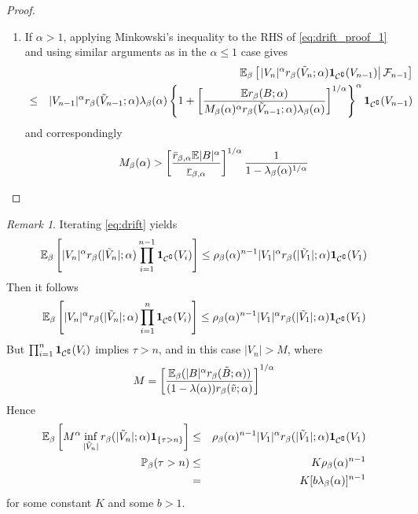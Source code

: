 \documentclass{article}
\theoremstyle{remark}
\newtheorem{remark}{Remark}
\begin{document}
\begin{proof}
\begin{enumerate}
    \item If $\alpha > 1$, applying Minkowski's inequality to the RHS
      of \eqref{eq:drift_proof_1} and using similar arguments as in
      the $\alpha \leq 1$ case gives
      \begin{eqnarray*}
        && \mathbb{E}_\beta \left[ \left.
          |V_n|^\alpha r_\beta(\tilde V_{n}; \alpha)
          \mathbf{1}_{\mathcal C^\complement}(V_{n-1})
          \right| \mathcal F_{n-1}
        \right] \\
        &\leq&
        |V_{n-1}|^\alpha r_\beta(\tilde V_{n-1}; \alpha)
        \lambda_\beta(\alpha) \left\{
          1 + \left[
            {
              \mathbb{E} r_\beta(B; \alpha)
              \over
              M_\beta(\alpha)^\alpha
              r_\beta(\tilde V_{n-1}; \alpha)
              \lambda_\beta(\alpha)
            }
          \right]^{1/\alpha}
          \right\}^\alpha
          \mathbf{1}_{\mathcal C^\complement}(V_{n-1})
      \end{eqnarray*}
      and correspondingly
      \begin{equation*}
        M_\beta(\alpha) > \left[
          {
            \bar r_{\beta,\alpha} \mathbb{E} |B|^\alpha
            \over
            \underline r_{\beta, \alpha}
          }
        \right]^{1/\alpha} {
          1 \over
          1 - \lambda_\beta(\alpha)^{1/\alpha}
        }
      \end{equation*}
  \end{enumerate}    
\end{proof}

\begin{remark}
  Iterating \eqref{eq:drift} yields
  \[
  \mathbb{E}_\beta \left[
    |V_n|^\alpha r_\beta(|\tilde V_n|; \alpha)
    \prod_{i=1}^{n-1}\mathbf{1}_{{\mathcal C}^\complement}(V_i)\right]
  \leq \rho_\beta(\alpha)^{n-1} |V_1|^\alpha r_\beta(|\tilde V_1|; \alpha) \mathbf{1}_{{\mathcal C}^\complement}(V_1)
  \]
  Then it follows
  \[
  \mathbb{E}_\beta \left[
    |V_n|^\alpha r_\beta(|\tilde V_n|; \alpha) \prod_{i=1}^{n}\mathbf{1}_{{\mathcal C}^\complement}(V_i)\right]
  \leq \rho_\beta(\alpha)^{n-1} |V_1|^\alpha r_\beta(|\tilde V_1|; \alpha) \mathbf{1}_{{\mathcal C}^\complement}(V_1)
  \]
  But $\prod_{i=1}^{n}\mathbf{1}_{{\mathcal C}^\complement}(V_i)$ implies $\tau > n$, and in this
  case $|V_n| > M$, where
  \[
  M = \left[
    \mathbb{E}_\beta (|B|^\alpha r_\beta(\tilde B; \alpha)) 
    \over
    (1 - \lambda(\alpha)) r_\beta(\tilde v; \alpha)
  \right]^{1/\alpha}
  \]
  Hence
  \begin{eqnarray}
    \mathbb{E}_\beta \left[
      M^\alpha \inf_{|\tilde V_n|} r_\beta(|\tilde V_n|; \alpha) \mathbf{1}_{\{\tau > n\}}\right]
    &\leq& \rho_\beta(\alpha)^{n-1} |V_1|^\alpha r_\beta(|\tilde V_1|;
    \alpha) \mathbf{1}_{{\mathcal C}^\complement}(V_1) \nonumber \\
    \mathbb{P}_\beta(\tau > n) &\leq& K \rho_\beta(\alpha)^{n-1} \\
    &=& K [b \lambda_{\beta}(\alpha)]^{n-1} \label{eq:ret_time}
  \end{eqnarray}
  for some constant $K$ and some $b > 1$.
\end{remark}
\end{document}
